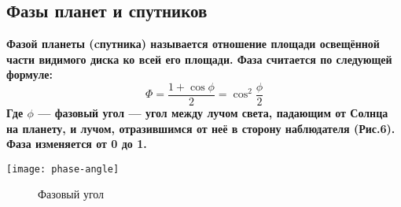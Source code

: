 \subsection{Фазы планет и спутников}

\bfseries Фазой \mdseries планеты (cпутника) называется отношение площади освещённой  части видимого диска ко всей его площади.
Фаза считается по следующей формуле:
\begin{equation}\Phi=\frac{1+\cos\phi}{2}=\cos^2\frac{\phi}{2}
\end{equation}
Где $\phi$ --- \textbf{фазовый угол} --- угол между лучом света, падающим от Солнца на планету, и лучом, отразившимся от неё в сторону наблюдателя (Рис.6). Фаза изменяется от 0 до 1.
\begin{center}
\texttt{[image: phase-angle]}
\begin{figure}[h!]
\caption{Фазовый угол}
\end{figure}
\end{center}

